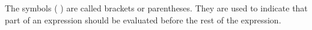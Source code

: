 \par
The symbols ( ) are called brackets or parentheses. 
They are used to indicate that part of an expression
should be evaluated before the rest of the
expression.
